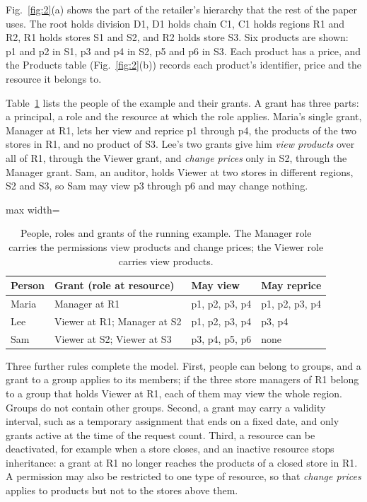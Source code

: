 \documentclass[conference]{IEEEtran}
\begin{document}
Fig.~\ref{fig:2}(a) shows the part of the retailer's hierarchy that the rest of the paper uses. The root holds division D1, D1 holds chain C1, C1 holds regions R1 and R2, R1 holds stores S1 and S2, and R2 holds store S3. Six products are shown: p1 and p2 in S1, p3 and p4 in S2, p5 and p6 in S3. Each product has a price, and the Products table (Fig.~\ref{fig:2}(b)) records each product's identifier, price and the resource it belongs to.

Table~\ref{tab:1} lists the people of the example and their grants. A grant has three parts: a principal, a role and the resource at which the role applies. Maria's single grant, Manager at R1, lets her view and reprice p1 through p4, the products of the two stores in R1, and no product of S3. Lee's two grants give him \emph{view products} over all of R1, through the Viewer grant, and \emph{change prices} only in S2, through the Manager grant. Sam, an auditor, holds Viewer at two stores in different regions, S2 and S3, so Sam may view p3 through p6 and may change nothing.

\begin{table}[!tp]
\centering
\caption{People, roles and grants of the running example. The Manager role carries the permissions view products and change prices; the Viewer role carries view products.}
\label{tab:1}
\scriptsize
\begin{adjustbox}{max width=\columnwidth}
\begin{tabular}{@{}llll@{}}
\toprule\noalign{}
Person & Grant (role at resource) & May view & May reprice \\
\midrule\noalign{}
Maria & Manager at R1 & p1, p2, p3, p4 & p1, p2, p3, p4 \\
Lee & Viewer at R1; Manager at S2 & p1, p2, p3, p4 & p3, p4 \\
Sam & Viewer at S2; Viewer at S3 & p3, p4, p5, p6 & none \\
\bottomrule
\end{tabular}
\end{adjustbox}
\end{table}

Three further rules complete the model. First, people can belong to groups, and a grant to a group applies to its members; if the three store managers of R1 belong to a group that holds Viewer at R1, each of them may view the whole region. Groups do not contain other groups. Second, a grant may carry a validity interval, such as a temporary assignment that ends on a fixed date, and only grants active at the time of the request count. Third, a resource can be deactivated, for example when a store closes, and an inactive resource stops inheritance: a grant at R1 no longer reaches the products of a closed store in R1. A permission may also be restricted to one type of resource, so that \emph{change prices} applies to products but not to the stores above them.
\end{document}
